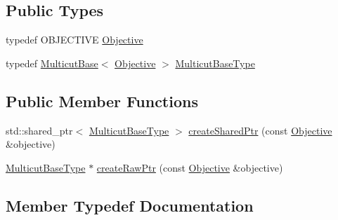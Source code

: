 \subsection*{Public Types}
\begin{DoxyCompactItemize}
\item 
typedef O\+B\+J\+E\+C\+T\+I\+V\+E \hyperlink{classnifty_1_1graph_1_1optimization_1_1multicut_1_1PyMulticutFactoryBase_a1588418d53a7aa9741c417acb51f0cd6}{Objective}
\item 
typedef \hyperlink{classnifty_1_1graph_1_1optimization_1_1multicut_1_1MulticutBase}{Multicut\+Base}$<$ \hyperlink{classnifty_1_1graph_1_1optimization_1_1multicut_1_1MulticutFactoryBase_a598ed08cf4e7b1c9ab0573213eb4e88d}{Objective} $>$ \hyperlink{classnifty_1_1graph_1_1optimization_1_1multicut_1_1PyMulticutFactoryBase_acbb932b601ef76b73e2adeb88908a4ae}{Multicut\+Base\+Type}
\end{DoxyCompactItemize}
\subsection*{Public Member Functions}
\begin{DoxyCompactItemize}
\item 
std\+::shared\+\_\+ptr$<$ \hyperlink{classnifty_1_1graph_1_1optimization_1_1multicut_1_1MulticutFactoryBase_a2d8fbd85c1542fef172da90ef55af326}{Multicut\+Base\+Type} $>$ \hyperlink{classnifty_1_1graph_1_1optimization_1_1multicut_1_1PyMulticutFactoryBase_ae7a3abc9543bf9477616fab6d7de2d27}{create\+Shared\+Ptr} (const \hyperlink{classnifty_1_1graph_1_1optimization_1_1multicut_1_1MulticutFactoryBase_a598ed08cf4e7b1c9ab0573213eb4e88d}{Objective} \&objective)
\item 
\hyperlink{classnifty_1_1graph_1_1optimization_1_1multicut_1_1MulticutFactoryBase_a2d8fbd85c1542fef172da90ef55af326}{Multicut\+Base\+Type} $\ast$ \hyperlink{classnifty_1_1graph_1_1optimization_1_1multicut_1_1PyMulticutFactoryBase_abd37ebd99186df38d6c35793587d3e86}{create\+Raw\+Ptr} (const \hyperlink{classnifty_1_1graph_1_1optimization_1_1multicut_1_1MulticutFactoryBase_a598ed08cf4e7b1c9ab0573213eb4e88d}{Objective} \&objective)
\end{DoxyCompactItemize}


\subsection{Member Typedef Documentation}
\hypertarget{classnifty_1_1graph_1_1optimization_1_1multicut_1_1PyMulticutFactoryBase_acbb932b601ef76b73e2adeb88908a4ae}{}
